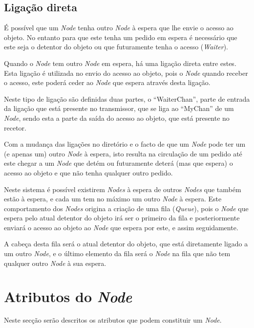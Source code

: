 
\subsection*{Ligação direta}
É possível que um \emph{Node} tenha outro \emph{Node} à espera que lhe envie o acesso ao objeto. No entanto para que este tenha um pedido em espera é necessário que este seja o detentor do objeto ou que futuramente tenha o acesso (\emph{Waiter}).

Quando o \emph{Node} tem outro \emph{Node} em espera, há uma ligação direta entre estes.
Esta ligação é utilizada no envio do acesso ao objeto, pois o \emph{Node} quando receber o acesso, este poderá ceder ao \emph{Node} que espera através desta ligação.

Neste tipo de ligação são definidas duas partes, o ``WaiterChan'', parte de entrada da ligação que está presente no transmissor, que se liga ao ``MyChan'' de um \emph{Node}, sendo esta a parte da saída do acesso ao objeto, que está presente no recetor.

Com a mudança das ligações no diretório e o facto de que um \emph{Node} pode ter um (e apenas um) outro \emph{Node} à espera, isto resulta na circulação de um pedido até este chegar a um \emph{Node} que detém ou futuramente deterá (mas que espera) o acesso ao objeto e que não tenha qualquer outro pedido.

Neste sistema é possível existirem \emph{Nodes} à espera de outros \emph{Nodes} que também estão à espera, e cada um tem no máximo um outro \emph{Node} à espera. 
Este comportamento dos \emph{Nodes} origina a criação de uma fila (\emph{Queue}), pois o \emph{Node} que espera pelo atual detentor do objeto irá ser o primeiro da fila e posteriormente enviará o acesso ao objeto ao \emph{Node} que espera por este, e assim seguidamente.

A cabeça desta fila será o atual detentor do objeto, que está diretamente ligado a um outro \emph{Node}, e o último elemento da fila será o \emph{Node} na fila que não tem qualquer outro \emph{Node} à sua espera.




\section{Atributos do \emph{Node}}
\label{especificacao:atr:section}
Neste secção serão descritos os atributos que podem constituir um \emph{Node}.

